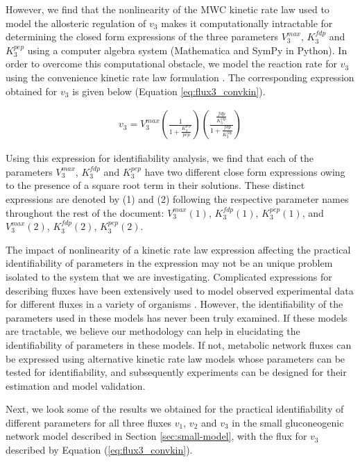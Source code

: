 \documentclass[10pt]{article}
\begin{document}
However, we find that the nonlinearity of the MWC kinetic rate law used to model the allosteric regulation of $v_3$ makes it computationally intractable for determining the closed form expressions of the three parameters $V_3^{max}$, $K_3^{fdp}$ and $K_3^{pep}$ using a computer algebra system (Mathematica and SymPy in Python). In order to overcome this computational obstacle, we model the reaction rate for $v_3$ using the convenience kinetic rate law formulation \parencite{Liebermeister2006}. The corresponding expression obtained for $v_3$ is given below (Equation \ref{eq:flux3_convkin}). 

\begin{align}\label{eq:flux3_convkin}
v_3 = V_3^{max}\left(\frac{1}{1 + \frac{K_3^{pep}}{pep}}\right)\left(\frac{\frac{fdp}{K_3^{fdp}}}{1 + \frac{fdp}{K_3^{fdp}}}\right)
\end{align}

Using this expression for identifiability analysis, we find that each of the parameters $V_3^{max}$, $K_3^{fdp}$ and $K_3^{pep}$ have two different close form expressions owing to the presence of a square root term in their solutions. These distinct expressions are denoted by (1) and (2) following the respective parameter names throughout the rest of the document: $V_3^{max}(1)$, $K_3^{fdp}(1)$, $K_3^{pep}(1)$, and $V_3^{max}(2)$, $K_3^{fdp}(2)$, $K_3^{pep}(2)$. 

The impact of nonlinearity of a kinetic rate law expression affecting the practical identifiability of parameters in the expression may not be an unique problem isolated to the system that we are investigating. Complicated expressions for describing fluxes have been extensively used to model observed experimental data for different fluxes in a variety of organisms \parencite{Chassagnole2002a, Peskov2012, VanHeerden2014}. However, the identifiability of the parameters used in these models has never been truly examined. If these models are tractable, we believe our methodology can help in elucidating the identifiability of parameters in these models. If not, metabolic network fluxes can be expressed using alternative kinetic rate law models whose parameters can be tested for identifiability, and subsequently experiments can be designed for their estimation and model validation.

Next, we look some of the results we obtained for the practical identifiability of different parameters for all three fluxes $v_1$, $v_2$ and $v_3$ in the small gluconeogenic network model described in Section \ref{sec:small-model}, with the flux for $v_3$ described by Equation (\ref{eq:flux3_convkin}).
\end{document}
